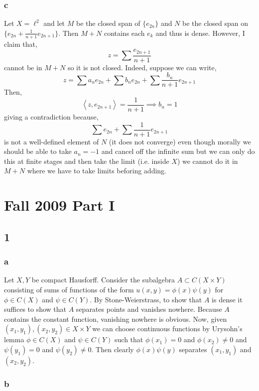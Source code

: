 \documentclass[12pt]{article}
\newcommand{\inner}[2]{\left< #1, #2 \right>}
\begin{document}
\subsubsection{c}

Let $X = \ell^2$ and let $M$ be the closed span of $\{ e_{2n} \}$ and $N$ be the closed span on $\{ e_{2n} + \frac{1}{n+1} e_{2n+1} \}$. Then $M + N$ contains each $e_k$ and thus is dense. However, I claim that,
\[ z = \sum \frac{e_{2n + 1}}{n+1} \]
cannot be in $M + N$ so it is not closed. Indeed, suppose we can write,
\[ z = \sum a_n e_{2n} + \sum b_n e_{2n} + \sum \frac{b_n}{n+1} e_{2n+1} \]
Then,
\[ \inner{z}{e_{2n+1}} = \frac{1}{n+1} \implies b_n = 1 \]
giving a contradiction because,
\[ \sum e_{2n} + \sum \frac{1}{n+1} e_{2n+1} \] 
is not a well-defined element of $N$ (it does not converge) even though morally we should be able to take $a_n = -1$ and cancel off the infinite sum but we can only do this at finite stages and then take the limit (i.e. inside $X$) we cannot do it in $M + N$ where we have to take limits beforing adding. 

\section{Fall 2009 Part I}

\subsection{1}

\subsubsection{a}

Let $X, Y$ be compact Hausforff. Consider the subalgebra $A \subset C(X \times Y)$ consisting of sums of functions of the form $u(x,y) = \phi(x) \psi(y)$ for $\phi \in C(X)$ and $\psi \in C(Y)$. By Stone-Weierstrass, to show that $A$ is dense it suffices to show that $A$ separates points and vanishes nowhere. Because $A$ contains the constant function, vanishing nowhere is obvious. Now, given $(x_1, y_1), (x_2, y_2) \in X \times Y$ we can choose continuous functions by Urysohn's lemma $\phi \in C(X)$ and $\psi \in C(Y)$ such that $\phi(x_1) = 0$ and $\phi(x_2) \neq 0$ and $\psi(y_1) = 0$ and $\psi(y_2) \neq 0$. Then clearly $\phi(x) \psi(y)$ separates $(x_1, y_1)$ and $(x_2, y_2)$.

\subsubsection{b}
\end{document}
